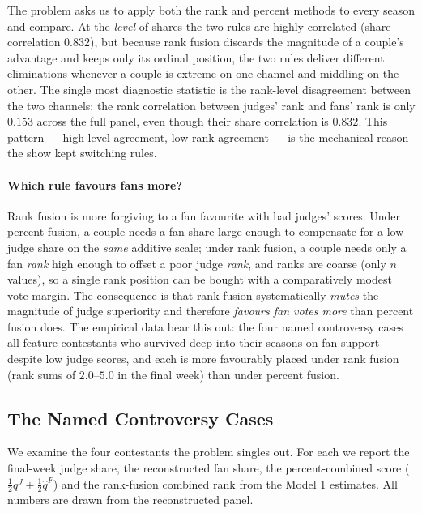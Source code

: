 \documentclass{article}
\begin{document}
The problem asks us to apply both the rank and percent methods to every season and compare.
At the \emph{level} of shares the two rules are highly correlated (share correlation
$0.832$), but because rank fusion discards the magnitude of a couple's advantage and keeps
only its ordinal position, the two rules deliver different eliminations whenever a couple is
extreme on one channel and middling on the other. The single most diagnostic statistic is
the rank-level disagreement between the two channels: the rank correlation between judges'
rank and fans' rank is only $\mathbf{0.153}$ across the full panel, even though their share
correlation is $0.832$. This pattern --- high level agreement, low rank agreement --- is the
mechanical reason the show kept switching rules.

\paragraph{Which rule favours fans more?} Rank fusion is more forgiving to a fan favourite
with bad judges' scores. Under percent fusion, a couple needs a fan share large enough to
compensate for a low judge share on the \emph{same} additive scale; under rank fusion, a
couple needs only a fan \emph{rank} high enough to offset a poor judge \emph{rank}, and
ranks are coarse (only $n$ values), so a single rank position can be bought with a
comparatively modest vote margin. The consequence is that rank fusion systematically
\emph{mutes} the magnitude of judge superiority and therefore \emph{favours fan votes more}
than percent fusion does. The empirical data bear this out: the four named controversy cases
all feature contestants who survived deep into their seasons on fan support despite low
judge scores, and each is more favourably placed under rank fusion (rank sums of $2.0$--$5.0$
in the final week) than under percent fusion.

\subsection{The Named Controversy Cases}

We examine the four contestants the problem singles out. For each we report the final-week
judge share, the reconstructed fan share, the percent-combined score
($\tfrac12 q^J + \tfrac12 \hat q^F$) and the rank-fusion combined rank from the Model 1
estimates. All numbers are drawn from the reconstructed panel.
\end{document}
